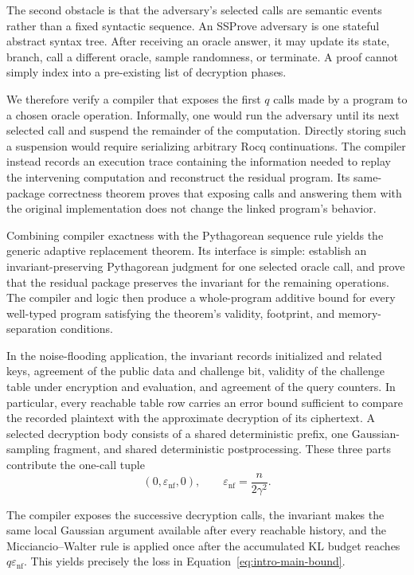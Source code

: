 The second obstacle is that the adversary's selected calls are semantic events rather than a fixed syntactic sequence. An SSProve adversary is one stateful abstract syntax tree. After receiving an oracle answer, it may update its state, branch, call a different oracle, sample randomness, or terminate. A proof cannot simply index into a pre-existing list of decryption phases.

We therefore verify a compiler that exposes the first $q$ calls made by a program to a chosen oracle operation. Informally, one would run the adversary until its next selected call and suspend the remainder of the computation. Directly storing such a suspension would require serializing arbitrary Rocq continuations. The compiler instead records an execution trace containing the information needed to replay the intervening computation and reconstruct the residual program. Its same-package correctness theorem proves that exposing calls and answering them with the original implementation does not change the linked program's behavior.

Combining compiler exactness with the Pythagorean sequence rule yields the generic adaptive replacement theorem. Its interface is simple: establish an invariant-preserving Pythagorean judgment for one selected oracle call, and prove that the residual package preserves the invariant for the remaining operations. The compiler and logic then produce a whole-program additive bound for every well-typed program satisfying the theorem's validity, footprint, and memory-separation conditions.

In the noise-flooding application, the invariant records initialized and related keys, agreement of the public data and challenge bit, validity of the challenge table under encryption and evaluation, and agreement of the query counters. In particular, every reachable table row carries an error bound sufficient to compare the recorded plaintext with the approximate decryption of its ciphertext. A selected decryption body consists of a shared deterministic prefix, one Gaussian-sampling fragment, and shared deterministic postprocessing. These three parts contribute the one-call tuple
\[
\left(0,\varepsilon_{\mathrm{nf}},0\right),
\qquad
\varepsilon_{\mathrm{nf}}
=
\frac{n}{2\gamma^{2}}.
\]

The compiler exposes the successive decryption calls, the invariant makes the same local Gaussian argument available after every reachable history, and the Micciancio--Walter rule is applied once after the accumulated KL budget reaches $q\varepsilon_{\mathrm{nf}}$. This yields precisely the loss in Equation~\eqref{eq:intro-main-bound}.

